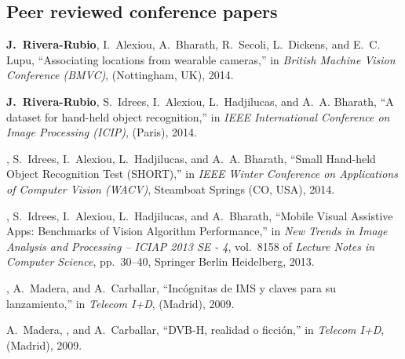 


\subsection{Peer reviewed conference papers}

\begin{thebibliography}{3}

\textbf{J.~Rivera-Rubio}, I.~Alexiou, A.~Bharath, R.~Secoli, L.~Dickens, and E.~C. Lupu,
  ``{Associating locations from wearable cameras},'' in {\em British Machine
  Vision Conference (BMVC)}, (Nottingham, UK), 2014.


\textbf{J.~Rivera-Rubio}, S.~Idrees, I.~Alexiou, L.~Hadjilucas, and A.~A. Bharath, ``{A
  dataset for hand-held object recognition},'' in {\em IEEE International
  Conference on Image Processing (ICIP)}, (Paris), 2014.

, S.~Idrees, I.~Alexiou, L.~Hadjilucas, and A.~A. Bharath,
  ``{Small Hand-held Object Recognition Test (SHORT)},'' in {\em IEEE Winter
  Conference on Applications of Computer Vision (WACV)}, Steamboat Springs
  (CO, USA), 2014.

, S.~Idrees, I.~Alexiou, L.~Hadjilucas, and A.~Bharath,
  ``{Mobile Visual Assistive Apps: Benchmarks of Vision Algorithm
  Performance},'' in {\em New Trends in Image Analysis and Processing -- ICIAP
  2013 SE - 4}, vol.~8158 of {\em Lecture Notes in Computer Science},
  pp.~30--40, Springer Berlin Heidelberg, 2013.

, A.~Madera, and A.~Carballar, ``{Inc\'{o}gnitas de IMS y claves
  para su lanzamiento},'' in {\em Telecom I+D}, (Madrid), 2009.

A.~Madera, , and A.~Carballar, ``{DVB-H, realidad o
  ficci\'{o}n},'' in {\em Telecom I+D}, (Madrid), 2009.
  
\end{thebibliography}

